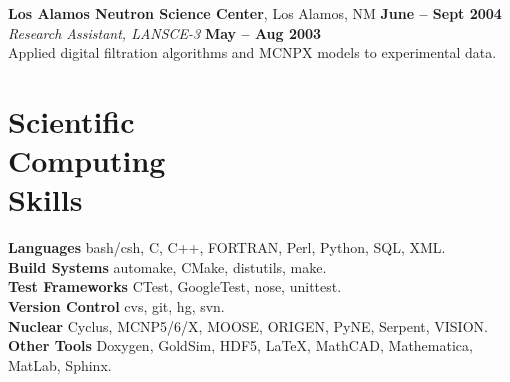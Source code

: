 \documentclass[margin,line]{resume}
\begin{document}
\begin{resume}
    \textbf{Los Alamos Neutron Science Center}, Los Alamos, NM \hfill \textbf{June -- Sept 2004}\\ 
                \textsl{Research Assistant, LANSCE-3} \hfill \textbf{May -- Aug 2003}\\
                Applied digital filtration algorithms and MCNPX models to experimental data.  \vspace{-3mm}
    \section{\mysidestyle Scientific\\Computing\\Skills} 
                \textbf{Languages} \hfill bash/csh, C, C++, FORTRAN, Perl, Python, SQL, XML.\vspace{.5mm}\\%
                \textbf{Build Systems} \hfill automake, CMake, distutils, make.\vspace{.5mm}\\%
                \textbf{Test Frameworks} \hfill CTest, GoogleTest, nose, unittest.\vspace{.5mm}\\%
                \textbf{Version Control} \hfill cvs, git, hg, svn.\vspace{.5mm}\\%
                \textbf{Nuclear} \hfill Cyclus, MCNP5/6/X, MOOSE, ORIGEN, PyNE, Serpent, VISION.\vspace{.5mm}\\%
                \textbf{Other Tools} \hfill Doxygen, GoldSim, HDF5, \LaTeX, MathCAD, Mathematica, MatLab, Sphinx.\vspace{.5mm}%
    \vspace{-3mm}

\end{resume}
\end{document}
